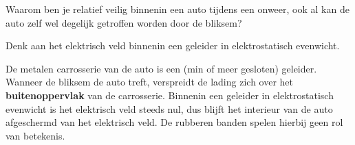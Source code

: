 \documentclass{ximera}
\begin{document}
\begin{question}
    Waarom ben je relatief veilig binnenin een auto tijdens een onweer, ook al kan de auto zelf wel degelijk getroffen worden door de bliksem?

    \begin{multipleChoice}
    \end{multipleChoice}
    
    \begin{hint}
        Denk aan het elektrisch veld binnenin een geleider in elektrostatisch evenwicht.
    \end{hint}

    \begin{solution}\nl
        De metalen carrosserie van de auto is een (min of meer gesloten) geleider. Wanneer de bliksem de auto treft, verspreidt de lading zich over het \textbf{buitenoppervlak} van de carrosserie. Binnenin een geleider in elektrostatisch evenwicht is het elektrisch veld steeds nul, dus blijft het interieur van de auto afgeschermd van het elektrisch veld. De rubberen banden spelen hierbij geen rol van betekenis.
    \end{solution}
\end{question}
\end{document}

